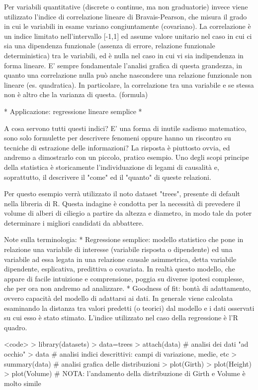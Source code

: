 \documentclass{book}
\begin{document}
Per variabili quantitative (discrete o continue, ma non graduatorie) invece viene utilizzato l'indice di correlazione lineare di Bravais-Pearson, che misura il grado in cui le variabili in esame variano congiuntamente (covariano).
La correlazione è un indice limitato nell'intervallo [-1,1] ed assume valore unitario nel caso in cui ci sia una dipendenza funzionale (assenza di errore, relazione funzionale deterministica) tra le variabili, ed è nulla nel caso in cui vi sia indipendenza in forma lineare. E' sempre fondamentale l'analisi grafica di questa grandezza, in quanto una correlazione nulla può anche nascondere una relazione funzionale non lineare (es. quadratica). In particolare, la correlazione tra una variabile e se stessa non è altro che la varianza di questa.
(formula)

	* Applicazione: regressione lineare semplice *

A cosa servono tutti questi indici? E' una forma di inutile sadismo matematico, sono solo formulette per descrivere fenomeni oppure hanno un riscontro su tecniche di estrazione delle informazioni? La risposta è piuttosto ovvia, ed andremo a dimostrarlo con un piccolo, pratico esempio.
Uno degli scopi principe della statistica è storicamente l'individuazione di legami di causalità e, soprattutto, il descrivere il "come" ed il "quanto" di queste relazioni.

Per questo esempio verrà utilizzato il noto dataset "trees", presente di default nella libreria di R. Questa indagine è condotta per la necessità di prevedere il volume di alberi di ciliegio a partire da altezza e diametro, in modo tale da poter determinare i migliori candidati da abbattere.

Note sulla terminologia:
* Regressione semplice: modello statistico che pone in relazione una variabile di interesse (variabile risposta o dipendente) ed una variabile ad essa legata in una relazione causale asimmetrica, detta variabile dipendente, esplicativa, predittiva o covariata. In realtà questo modello, che appare di facile intuizione e comprensione, poggia su diverse ipotesi complesse, che per ora non andremo ad analizzare.
* Goodness of fit: bontà di adattamento, ovvero capacità del modello di adattarsi ai dati. In generale viene calcolata esaminando la distanza tra valori predetti (o teorici) dal modello e i dati osservati su cui esso è stato stimato. L'indice utilizzato nel caso della regressione è l'R quadro.


<code>
> library(datasets)
> data=trees
> attach(data)
#  analisi dei dati "ad occhio"
> data
# analisi indici descrittivi: campi di variazione, medie, etc
> summary(data)
# analisi grafica delle distribuzioni
> plot(Girth)
> plot(Height)
> plot(Volume)
# NOTA: l'andamento della distribuzione di Girth e Volume è molto simile
\end{document}
